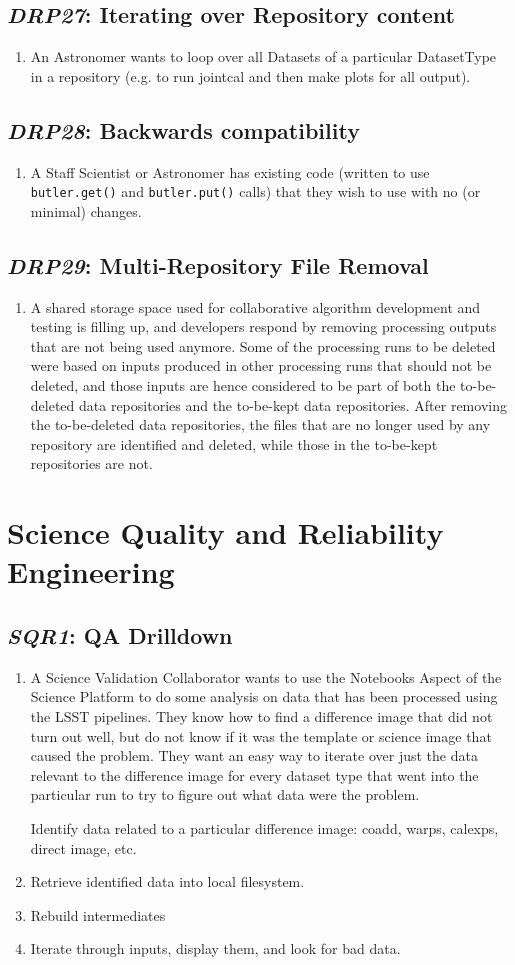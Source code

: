 \documentclass[DM,toc,lsstdraft]{lsstdoc}
\newcommand{\usecase}[3]{%
\subsection{\emph{#1}: #2}
\label{use:#1}
\begin{enumerate}[label=\alph*.]
#3
\end{enumerate}
}
\begin{document}
\usecase{DRP27}{Iterating over Repository content}{%

\item
An Astronomer wants to loop over all Datasets of a particular DatasetType in a repository (e.g. to run jointcal and then make plots for all output).
}

\usecase{DRP28}{Backwards compatibility}{%

\item
A Staff Scientist or Astronomer has existing code (written to use \texttt{butler.get()} and \texttt{butler.put()} calls) that they wish to use with no (or minimal) changes.
}

\usecase{DRP29}{Multi-Repository File Removal}{%

\item
A shared storage space used for collaborative algorithm development and testing is filling up, and developers respond by removing processing outputs that are not being used anymore.
Some of the processing runs to be deleted were based on inputs produced in other processing runs that should not be deleted, and those inputs are hence considered to be part of both the to-be-deleted data repositories and the to-be-kept data repositories.
After removing the to-be-deleted data repositories, the files that are no longer used by any repository are identified and deleted, while those in the to-be-kept repositories are not.
}

\section{Science Quality and Reliability Engineering}

\usecase{SQR1}{QA Drilldown}{%

\item
A Science Validation Collaborator wants to use the Notebooks Aspect of the Science Platform to do some analysis on data that has been processed using the LSST pipelines.
They know how to find a difference image that did not turn out well, but do not know if it was the template or science image that caused the problem.
They want an easy way to iterate over just the data relevant to the difference image for every dataset type that went into the particular run to try to figure out what data were the problem.

Identify data related to a particular difference image: coadd, warps, calexps, direct image, etc.

\item
Retrieve identified data into local filesystem.

\item
Rebuild intermediates

\item
Iterate through inputs, display them, and look for bad data.

}
\end{document}
